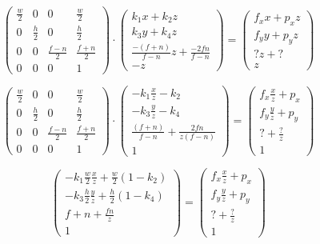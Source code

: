 \begin{equation}
\begin{pmatrix}
\frac{w}{2} & 0 & 0 & \frac{w}{2} \\
0 & \frac{h}{2} & 0 & \frac{h}{2} \\
0 & 0 & \frac{f-n}{2} & \frac{f+n}{2} \\
0 & 0 & 0 & 1
\end{pmatrix}
\cdot
\begin{pmatrix}
k_1 x + k_2 z \\
k_3 y + k_4 z \\
\frac{-(f+n)}{f-n} z + \frac{-2fn}{f-n} \\
-z
\end{pmatrix}
=
\begin{pmatrix}
f_x x + p_x z \\
f_y y + p_y z \\
? z + ? \\
z
\end{pmatrix}
\label{eq:rovnost_matic3}
\end{equation}

\begin{equation}
\begin{pmatrix}
\frac{w}{2} & 0 & 0 & \frac{w}{2} \\
0 & \frac{h}{2} & 0 & \frac{h}{2} \\
0 & 0 & \frac{f-n}{2} & \frac{f+n}{2} \\
0 & 0 & 0 & 1
\end{pmatrix}
\cdot
\begin{pmatrix}
- k_1 \frac{x}{z} - k_2 \\
- k_3 \frac{y}{z} - k_4 \\
\frac{(f+n)}{f-n} + \frac{2fn}{z(f-n)} \\
1
\end{pmatrix}
=
\begin{pmatrix}
f_x \frac{x}{z} + p_x \\
f_y \frac{y}{z} + p_y \\
? + \frac{?}{z} \\
1
\end{pmatrix}
\label{eq:rovnost_matic4}
\end{equation}

\begin{equation}
\begin{pmatrix}
- k_1 \frac{w}{2} \frac{x}{z} + \frac{w}{2} (1 - k_2)\\
- k_3 \frac{h}{2} \frac{y}{z} + \frac{h}{2} (1 - k_4)\\
f + n + \frac{fn}{z} \\
1
\end{pmatrix}
=
\begin{pmatrix}
f_x \frac{x}{z} + p_x \\
f_y \frac{y}{z} + p_y \\
? + \frac{?}{z} \\
1
\end{pmatrix}
\label{eq:rovnost_matic5}
\end{equation}

